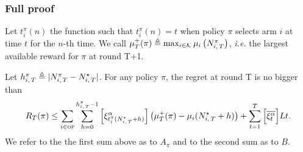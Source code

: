 \subsubsection*{Full proof}
\label{ss:rested-proof}
Let $t_i^\pi(n)$ the function such that $t_i^\pi(n) = t$ when policy $\pi$ selects arm $i$ at time $t$ for the $n$-th time. We call $\mu_T^+(\pi) \triangleq \max_{i \in \mathcal{K}} \mu_i\left(N_{i,\,T}^\pi\right)$, \textit{i.e.} the largest available reward for $\pi$ at round T+1.  
\begin{lemma}
\label{lem:regret-decompo}
 Let $h_{i,\,T}^\pi \triangleq | N_{i,\,T}^\pi - N_{i,\,T}^{\star}|$. For any policy $\pi$, the regret at round T is no bigger than
\begin{equation*}
R_T(\pi) \leq \sum_{i \in \textsc{op}} \sum_{h=0}^{h_{i,\,T}^\pi-1}\left[\xi^\alpha_{t_i^\pi(N_{i,\,T}^\star + h)} \right]\left(\mu^+_T(\pi) - \mu_i(N_{i,\,T}^{\star} + h ) \right) + \sum_{t=1}^T \Big[\overline{\xi^\alpha_t}\Big]Lt.
\end{equation*}
We refer to the the first sum above as to $A_\pi$ and to the second sum as to $B$.
\end{lemma}
